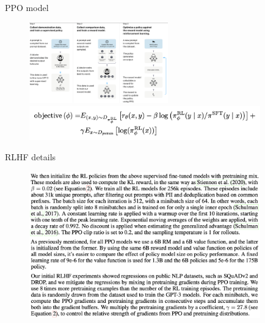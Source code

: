 \begin{vbframe}{PPO model}


\begin{figure}
\centering
\includegraphics[width = 6cm]{figure/threesteps.png}

\includegraphics[width = 10cm]{figure/objectiveppo.png}
\end{figure}



\vfill

\end{vbframe}


\begin{vbframe}{RLHF details}


\begin{figure}
\centering
\includegraphics[width = 10cm]{figure/rlhfdetails.png}
\end{figure}



\vfill

\end{vbframe}




